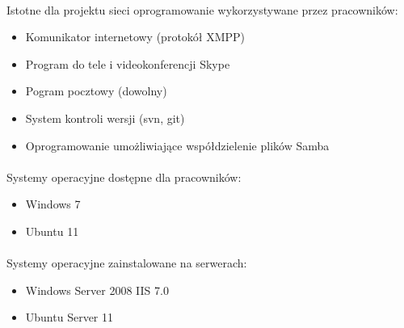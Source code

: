 \paragraph{}
Istotne dla projektu sieci oprogramowanie wykorzystywane przez pracowników:
\begin{itemize}
  \item Komunikator internetowy (protokół XMPP)
  \item Program do tele i videokonferencji Skype
  \item Pogram pocztowy (dowolny)
  \item System kontroli wersji (svn, git)
  \item Oprogramowanie umożliwiające współdzielenie plików Samba
\end{itemize}

\paragraph{}
Systemy operacyjne dostępne dla pracowników:
\begin{itemize}
  \item Windows 7
  \item Ubuntu 11
\end{itemize}

\paragraph{}
Systemy operacyjne zainstalowane na serwerach:
\begin{itemize}
  \item Windows Server 2008 IIS 7.0
  \item Ubuntu Server 11
\end{itemize}




